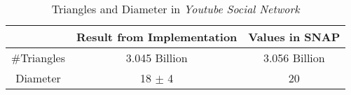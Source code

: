 \documentclass[12pt]{article}
\begin{document}
\begin{table}[H]
\centering
\begin{tabular}{|c|c|c|}
\hline
\multicolumn{1}{|l|}{} & Result from Implementation & Values in SNAP \\ \hline
\#Triangles &  3.045 Billion & 3.056 Billion \\
Diameter & 18 $\pm$ 4 & 20 \\ \hline
\end{tabular}
\caption{Triangles and Diameter in {\it Youtube Social Network}}
\label{youtube_dia}
\end{table}

%
%
\newpage


%
\end{document}
